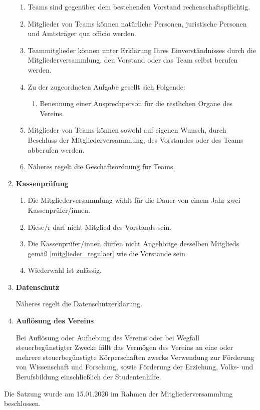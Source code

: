 \documentclass[german]{article}
\newcommand{\paragr}[1]{\item \textsf{\textbf{#1}}}
\begin{document}
\begin{enumerate}
\begin{enumerate}
\item Teams sind gegenüber dem bestehenden Vorstand rechenschaftspflichtig.

\item Mitglieder von Teams können natürliche Personen, juristische Personen und Amtsträger qua officio werden.

\item Teammitglieder können unter Erklärung Ihres Einverständnisses durch die Mitgliederversammlung, den Vorstand oder das Team selbst berufen werden.

\item Zu der zugeordneten Aufgabe gesellt sich Folgende:
\begin{enumerate}
\item Benennung einer Ansprechperson für die restlichen Organe des Vereins.
\end{enumerate}

\item Mitglieder von Teams können sowohl auf eigenen Wunsch, durch Beschluss der Mitgliederversammlung, des Vorstandes oder des Teams abberufen werden.

\item Näheres regelt die Geschäftsordnung für Teams.

\end{enumerate}


\paragr{Kassenprüfung}
\begin{enumerate}

\item Die Mitgliederversammlung wählt für die Dauer von einem Jahr zwei Kassenprüfer/innen.

\item Diese/r darf nicht Mitglied des Vorstands sein.

\item Die Kassenprüfer/innen dürfen nicht Angehörige desselben Mitglieds gemäß \ref{mitglieder_regulaer} wie die Vorstände sein.

\item Wiederwahl ist zulässig.

\end{enumerate}


\paragr{Datenschutz}

Näheres regelt die Datenschutzerklärung.


\paragr{Auflösung des Vereins}

Bei Auflösung oder Aufhebung des Vereins oder bei Wegfall steuerbegünstigter Zwecke fällt das Vermögen des Vereins an eine oder mehrere steuerbegünstigte Körperschaften zwecks Verwendung zur Förderung von Wissenschaft und Forschung, sowie Förderung der Erziehung, Volks- und Berufsbildung einschließlich der Studentenhilfe.


\end{enumerate}
\vspace{2cm}
Die Satzung wurde am 15.01.2020 im Rahmen der Mitgliederversammlung beschlossen.
	
\end{document}
